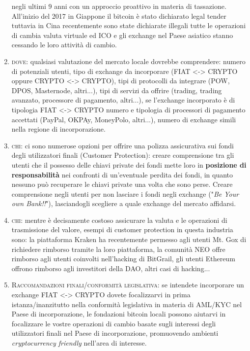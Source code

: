 \documentclass[11pt,fleqn,oneside]{book} %
\begin{document}
\begin{enumerate}
	negli ultimi 9 anni con un approccio proattivo in materia di tassazione. All'inizio del 2017 in Giappone il bitcoin è stato 
	dichiarato legal tender tuttavia in Cina recentemente sono state dichiarate illegali tutte le operazioni di cambia valuta virtuale ed ICO 
	e gli exchange nel Paese asiatico stanno cessando le loro attività di cambio. 
	\item \textsc{dove}: qualsiasi valutazione del mercato locale dovrebbe comprendere: numero di potenziali utenti, tipo di exchange da 
	incorporare (FIAT <-> CRYPTO oppure CRYPTO <-> CRYPTO), tipi di protocolli da integrare (POW, DPOS, Masternode, altri...), 
	tipi di servizi da offrire (trading, trading avanzato, processore di pagamento, altri...), se l'exchange incorporato è di tipologia
	FIAT <-> CRYPTO numero e tipologia di processori di pagamento accettati (PayPal, OKPAy, MoneyPolo, altri...), numero di exchange
	simili nella regione di incorporazione. 
	\item \textsc{chi}: ci sono numerose opzioni per offrire una polizza assicurativa sui fondi degli utilizzatori finali (Customer Protection):
	creare comprensione tra gli utenti che il possesso delle chiavi private dei fondi mette loro in \textbf{posizione di responsabilità} 
	nei confronti di un'eventuale perdita dei fondi, in quanto nessuno può recuperare le chiavi private una volta che sono perse. 
	Creare comprensione negli utenti per non lasciare i fondi negli exchange ("\textit{Be Your own Bank!!}"), lasciandogli scegliere a quale
	exchange del mercato affidarsi.
	\item \textsc{chi}: mentre è decisamente costoso assicurare la valuta e le operazioni di trasmissione del valore, esempi di customer protection
	in questa industria sono: la piattaforma Kraken ha recentemente permesso agli utenti Mt. Gox di richiedere rimborso tramite
	la loro piattaforma, la comunità NEO offre rimborso agli utenti coinvolti nell'hacking di BitGrail, gli utenti Ethereum
	offrono rimborso agli investitori della DAO, altri casi di hacking...
	\item \textsc{Raccomandazioni finali/conformità legislativa}: se intendete incorporare un exchange FIAT <-> CRYPTO dovete focalizzarvi
	in prima istanza/inanzitutto nella conformità legislativa in materia di AML/KYC nel Paese di incorporazione, le fondazioni
	bitcoin locali possono aiutarvi in focalizzare le vostre operazioni di cambio basate sugli interessi degli utilizzatori finali 
	nel Paese di incorporazione, promuovendo ambienti \textit{cryptocurrency friendly} nell'area di interesse.
\end{enumerate}
\end{document}
